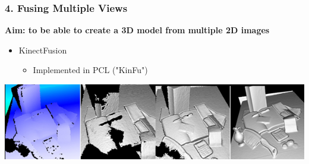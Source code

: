 \begin{frame}[t] \frametitle{4. Fusing Multiple Views}

	\textbf{Aim: to be able to create a 3D model from multiple 2D images}

	\medskip

	\begin{itemize}




		\item KinectFusion
		\medskip
		\begin{itemize}
			\item Implemented in PCL ("KinFu")
		\end{itemize}



	\end{itemize}

	\vfill

	\centering
	\includegraphics[width=.8\linewidth]{src/kinectfusion.png}



\end{frame}


